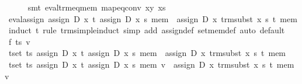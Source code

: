 \begin{isabellebody}
\ \ \ \ \isamarkupfalse%
\ {}smt\ eval{}trm{}eq{}mem\ map{}eq{}conv\ xy\ xs{}\isanewline
{}\isamarkupfalse%
%
\endisatagproof
{\isafoldproof}%
%
\isadelimproof
\isanewline
%
\endisadelimproof
\isanewline
{}\isamarkupfalse%
\ eval{}assign{}{}\ {}assign\ D\ x\ t\ {}assign\ D\ x\ s\ mem{}\ {}\ assign\ D\ x\ {}trm{}subst\ x\ s\ t{}\ mem{}\isanewline
%
\isadelimproof
%
\endisadelimproof
%
\isatagproof
{}\isamarkupfalse%
\ {}induct\ t\ rule{}\ trm{}simple{}induct{}\ simp\ add{}\ assign{}def\ set{}mem{}def{}\ auto{}\ default{}\isanewline
\ \ \isamarkupfalse%
\ f\ ts\ v\isanewline
\ \ \isamarkupfalse%
\ {}{}t{}set\ ts{}\ assign\ D\ x\ t\ {}assign\ D\ x\ s\ mem{}\ {}\ assign\ D\ x\ {}trm{}subst\ x\ s\ t{}\ mem{}\isanewline
\ \ \isamarkupfalse%
\ {}{}t{}set\ ts{}\ assign\ D\ x\ t\ {}assign\ D\ x\ s\ mem{}\ v\ {}\ assign\ D\ x\ {}trm{}subst\ x\ s\ t{}\ mem\ v{}\isanewline

\end{isabellebody}
